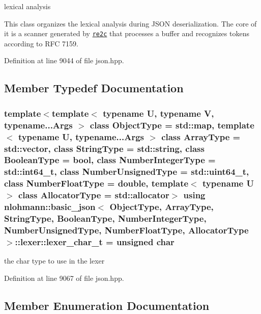 lexical analysis 

This class organizes the lexical analysis during J\+S\+O\+N deserialization. The core of it is a scanner generated by \href{http://re2c.org}{\tt re2c} that processes a buffer and recognizes tokens according to R\+F\+C 7159. 

Definition at line 9044 of file json.\+hpp.



\subsection{Member Typedef Documentation}
\hypertarget{classnlohmann_1_1basic__json_1_1lexer_a7858ae971d07f21ad47fa8a0421001db}{}
\subsubsection[{lexer\+\_\+char\+\_\+t}]{\setlength{\rightskip}{0pt plus 5cm}template$<$template$<$ typename U, typename V, typename...\+Args $>$ class Object\+Type = std\+::map, template$<$ typename U, typename...\+Args $>$ class Array\+Type = std\+::vector, class String\+Type  = std\+::string, class Boolean\+Type  = bool, class Number\+Integer\+Type  = std\+::int64\+\_\+t, class Number\+Unsigned\+Type  = std\+::uint64\+\_\+t, class Number\+Float\+Type  = double, template$<$ typename U $>$ class Allocator\+Type = std\+::allocator$>$ using {\bf nlohmann\+::basic\+\_\+json}$<$ Object\+Type, Array\+Type, String\+Type, Boolean\+Type, Number\+Integer\+Type, Number\+Unsigned\+Type, Number\+Float\+Type, Allocator\+Type $>$\+::{\bf lexer\+::lexer\+\_\+char\+\_\+t} =  unsigned char}\label{classnlohmann_1_1basic__json_1_1lexer_a7858ae971d07f21ad47fa8a0421001db}


the char type to use in the lexer 



Definition at line 9067 of file json.\+hpp.



\subsection{Member Enumeration Documentation}
\hypertarget{classnlohmann_1_1basic__json_1_1lexer_a96887d6cd131e3d3a85a9d71fbdbcdf7}{}
